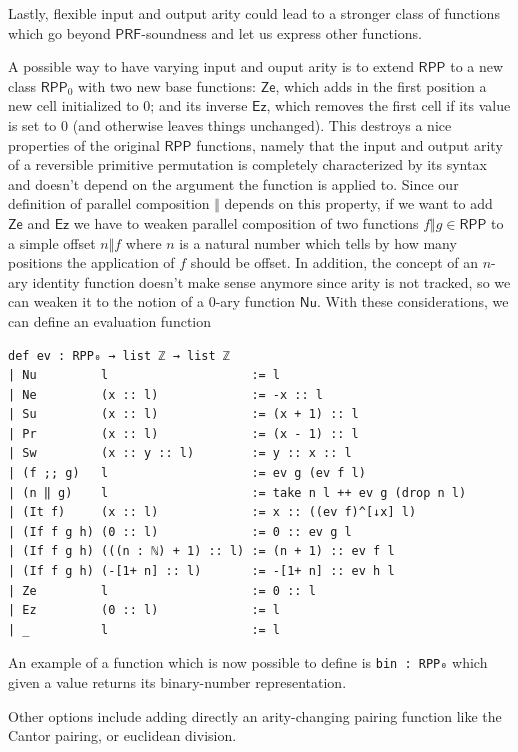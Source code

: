 \documentclass{book}
\theoremstyle{definition}
\theoremstyle{remark}
\theoremstyle{plain}
\newcommand{\RPP}{\mathsf{RPP}}
\newcommand{\rppPa}{\Vert}
\newcommand{\rppNu}{\mathsf{Nu}}
\newcommand{\rppZe}{\mathsf{Ze}}
\newcommand{\rppEz}{\mathsf{Ez}}
\newcommand{\PRF}{\mathsf{PRF}}
\begin{document}
Lastly, flexible input and output arity could lead to a stronger class of functions which
go beyond $\PRF$-soundness and let us express other functions.

A possible way to have varying input and ouput arity is to extend $\RPP$ to a new class $\RPP_0$ with two new base functions:
$\rppZe$, which adds in the first position a new cell initialized to $0$;
and its inverse $\rppEz$, which removes the first cell if its value is set to $0$ (and otherwise leaves things unchanged).
This destroys a nice properties of the original $\RPP$ functions,
namely that the input and output arity of a reversible primitive permutation is completely characterized by its syntax
and doesn't depend on the argument the function is applied to.
Since our definition of parallel composition $\rppPa$ depends on this property, if we want to add $\rppZe$ and $\rppEz$
we have to weaken parallel composition of two functions $f \rppPa g \in \RPP$ to a simple offset $n \rppPa f$
where $n$ is a natural number which tells by how many positions the application of $f$ should be offset.
In addition, the concept of an $n$-ary identity function doesn't make sense anymore
since arity is not tracked, so we can weaken it to the notion of a $0$-ary function $\rppNu$.
With these considerations, we can define an evaluation function
\begin{lstlisting}
def ev : RPP₀ → list ℤ → list ℤ
| Nu         l                    := l
| Ne         (x :: l)             := -x :: l
| Su         (x :: l)             := (x + 1) :: l
| Pr         (x :: l)             := (x - 1) :: l
| Sw         (x :: y :: l)        := y :: x :: l
| (f ;; g)   l                    := ev g (ev f l)
| (n ‖ g)    l                    := take n l ++ ev g (drop n l)
| (It f)     (x :: l)             := x :: ((ev f)^[↓x] l)
| (If f g h) (0 :: l)             := 0 :: ev g l
| (If f g h) (((n : ℕ) + 1) :: l) := (n + 1) :: ev f l
| (If f g h) (-[1+ n] :: l)       := -[1+ n] :: ev h l
| Ze         l                    := 0 :: l
| Ez         (0 :: l)             := l
| _          l                    := l
\end{lstlisting}
An example of a function which is now possible to define is \lstinline{bin : RPP₀} which
given a value returns its binary-number representation.

Other options include adding directly an arity-changing pairing function like the Cantor pairing,
or euclidean division.

\paragraph{}
\end{document}
